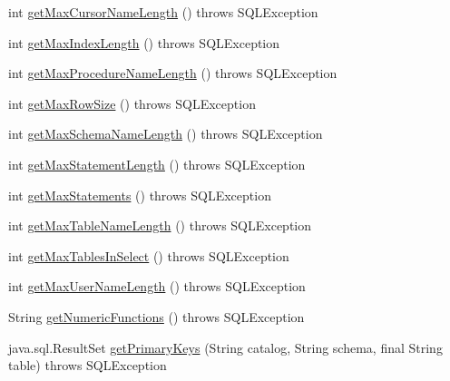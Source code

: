 \begin{DoxyCompactItemize}
\item 
int \mbox{\hyperlink{classcom_1_1mysql_1_1cj_1_1jdbc_1_1_database_meta_data_a2b6f44e542d7d900cd2f7176bdeee045}{get\+Max\+Cursor\+Name\+Length}} ()  throws S\+Q\+L\+Exception 
\item 
int \mbox{\hyperlink{classcom_1_1mysql_1_1cj_1_1jdbc_1_1_database_meta_data_a2a51a83e52633c6ec15442648af0cf12}{get\+Max\+Index\+Length}} ()  throws S\+Q\+L\+Exception 
\item 
int \mbox{\hyperlink{classcom_1_1mysql_1_1cj_1_1jdbc_1_1_database_meta_data_a298c4827786b7801d1bc85a37c643a3b}{get\+Max\+Procedure\+Name\+Length}} ()  throws S\+Q\+L\+Exception 
\item 
int \mbox{\hyperlink{classcom_1_1mysql_1_1cj_1_1jdbc_1_1_database_meta_data_ad4f6654c296ca5239cbe62b036363df3}{get\+Max\+Row\+Size}} ()  throws S\+Q\+L\+Exception 
\item 
int \mbox{\hyperlink{classcom_1_1mysql_1_1cj_1_1jdbc_1_1_database_meta_data_a5173b480262679925fc705e1efd9b7f2}{get\+Max\+Schema\+Name\+Length}} ()  throws S\+Q\+L\+Exception 
\item 
int \mbox{\hyperlink{classcom_1_1mysql_1_1cj_1_1jdbc_1_1_database_meta_data_adf0c116c8183dde21674d747b8315ba6}{get\+Max\+Statement\+Length}} ()  throws S\+Q\+L\+Exception 
\item 
int \mbox{\hyperlink{classcom_1_1mysql_1_1cj_1_1jdbc_1_1_database_meta_data_a576f3289bac06848f324aec66c02da4e}{get\+Max\+Statements}} ()  throws S\+Q\+L\+Exception 
\item 
int \mbox{\hyperlink{classcom_1_1mysql_1_1cj_1_1jdbc_1_1_database_meta_data_af978ccdd2bc8b3ae59560fb7d60c35b8}{get\+Max\+Table\+Name\+Length}} ()  throws S\+Q\+L\+Exception 
\item 
int \mbox{\hyperlink{classcom_1_1mysql_1_1cj_1_1jdbc_1_1_database_meta_data_a5069f21272831c21a1c4fb132193a53d}{get\+Max\+Tables\+In\+Select}} ()  throws S\+Q\+L\+Exception 
\item 
int \mbox{\hyperlink{classcom_1_1mysql_1_1cj_1_1jdbc_1_1_database_meta_data_a1db300512ebbf0e6accd4b4b34aa886f}{get\+Max\+User\+Name\+Length}} ()  throws S\+Q\+L\+Exception 
\item 
String \mbox{\hyperlink{classcom_1_1mysql_1_1cj_1_1jdbc_1_1_database_meta_data_ac051ffbe456985aca58313ed7215b91c}{get\+Numeric\+Functions}} ()  throws S\+Q\+L\+Exception 
\item 
java.\+sql.\+Result\+Set \mbox{\hyperlink{classcom_1_1mysql_1_1cj_1_1jdbc_1_1_database_meta_data_a54a97d018612f19a9b905116d7e0459e}{get\+Primary\+Keys}} (String catalog, String schema, final String table)  throws S\+Q\+L\+Exception 

\end{DoxyCompactItemize}
